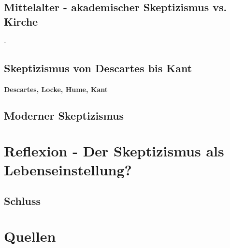\documentclass[12pt,a4paper]{article}
\begin{document}
	\subsection{Mittelalter - akademischer Skeptizismus vs. Kirche}
		-%
	\subsection{Skeptizismus von Descartes bis Kant}
		\paragraph{Descartes, Locke, Hume, Kant}
	\subsection{Moderner Skeptizismus}
\section{Reflexion - Der Skeptizismus als Lebenseinstellung?}
	\subsection{Schluss}


\section*{Quellen}
\end{document}
